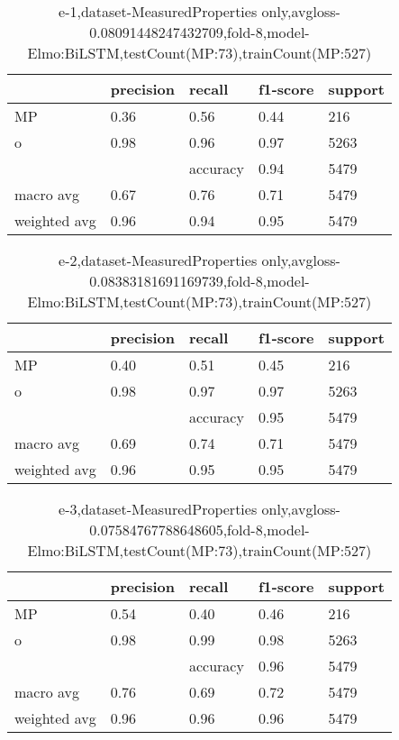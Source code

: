 \begin{table}[!ht] 
\centering
\caption{e-1,dataset-MeasuredProperties only,avgloss-0.08091448247432709,fold-8,model-Elmo:BiLSTM,testCount(MP:73),trainCount(MP:527)}\label{e-1data-mpS.tsv}
\begin{tabularx}{300pt}{|X|X|X|X|X|}
\hline
&precision&recall&f1-score&support\\
\hline
MP&0.36&0.56&0.44&216\\
\hline
o&0.98&0.96&0.97&5263\\
\hline
&&accuracy&0.94&5479\\
\hline
macro avg&0.67&0.76&0.71&5479\\
\hline
weighted avg&0.96&0.94&0.95&5479\\
\hline
\end{tabularx}
\end{table}
\begin{table}[!ht] 
\centering
\caption{e-2,dataset-MeasuredProperties only,avgloss-0.08383181691169739,fold-8,model-Elmo:BiLSTM,testCount(MP:73),trainCount(MP:527)}\label{e-2data-mpS.tsv}
\begin{tabularx}{300pt}{|X|X|X|X|X|}
\hline
&precision&recall&f1-score&support\\
\hline
MP&0.40&0.51&0.45&216\\
\hline
o&0.98&0.97&0.97&5263\\
\hline
&&accuracy&0.95&5479\\
\hline
macro avg&0.69&0.74&0.71&5479\\
\hline
weighted avg&0.96&0.95&0.95&5479\\
\hline
\end{tabularx}
\end{table}
\begin{table}[!ht] 
\centering
\caption{e-3,dataset-MeasuredProperties only,avgloss-0.07584767788648605,fold-8,model-Elmo:BiLSTM,testCount(MP:73),trainCount(MP:527)}\label{e-3data-mpS.tsv}
\begin{tabularx}{300pt}{|X|X|X|X|X|}
\hline
&precision&recall&f1-score&support\\
\hline
MP&0.54&0.40&0.46&216\\
\hline
o&0.98&0.99&0.98&5263\\
\hline
&&accuracy&0.96&5479\\
\hline
macro avg&0.76&0.69&0.72&5479\\
\hline
weighted avg&0.96&0.96&0.96&5479\\
\hline
\end{tabularx}
\end{table}
